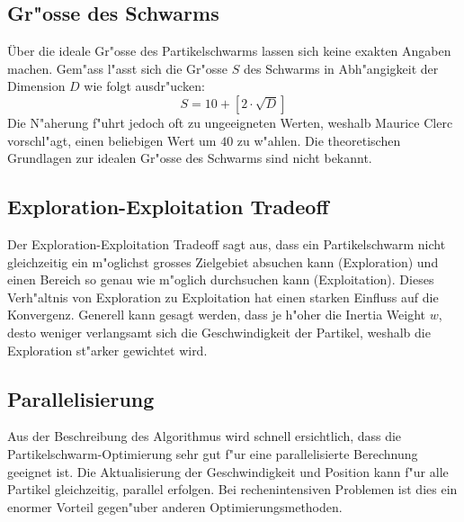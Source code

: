 \subsection{Gr"osse des Schwarms}
Über die ideale Gr"osse des Partikelschwarms lassen sich keine exakten
Angaben machen. Gem"ass \cite{Clerc-Standards} l"asst sich die Gr"osse
$S$ des Schwarms in Abh"angigkeit der Dimension $D$ wie folgt ausdr"ucken:
\begin{equation}
	S = 10 + \left[ 2 \cdot \sqrt{D} \right]
\end{equation}
Die N"aherung f"uhrt jedoch oft zu ungeeigneten Werten, weshalb Maurice
Clerc vorschl"agt, einen beliebigen Wert um $40$ zu w"ahlen. Die
theoretischen Grundlagen zur idealen Gr"osse des Schwarms sind nicht
bekannt.


\subsection{Exploration-Exploitation Tradeoff}
Der Exploration-Exploitation Tradeoff sagt aus, dass ein Partikelschwarm
nicht gleichzeitig ein m"oglichst grosses Zielgebiet absuchen kann
(Exploration) und einen Bereich so genau wie m"oglich durchsuchen kann
(Exploitation). Dieses Verh"altnis von Exploration zu Exploitation hat
einen starken Einfluss auf die Konvergenz. Generell kann gesagt werden,
dass je h"oher die Inertia Weight $w$, desto weniger verlangsamt sich
die Geschwindigkeit der Partikel, weshalb die Exploration st"arker
gewichtet wird.

\subsection{Parallelisierung}
Aus der Beschreibung des Algorithmus wird schnell ersichtlich, dass
die Partikelschwarm-Optimierung sehr gut f"ur eine parallelisierte
Berechnung geeignet ist. Die Aktualisierung der Geschwindigkeit und
Position kann f"ur alle Partikel gleichzeitig, parallel erfolgen. Bei
rechenintensiven Problemen ist dies ein enormer Vorteil gegen"uber
anderen Optimierungsmethoden.




